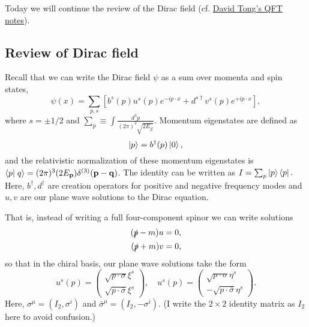 Today we will continue the review of the Dirac field (cf. \href{http://www.damtp.cam.ac.uk/user/tong/qft.html}{David Tong's QFT notes}).

\subsection*{Review of Dirac field} Recall that we can write the Dirac field $\psi$ as a sum over momenta and spin states,
\begin{equation}
    \psi(x)=\sum_{p,s}\left[ b^s(p) u^s(p) e^{-ip\cdot x}+d^{s\dagger}v^s(p) e^{+ip\cdot x}\right],
\end{equation}
where $s=\pm 1/2$ and $\sum_p\equiv \int \frac{d^3p}{(2\pi)^3 \sqrt{2E_{\vec p}}}$. Momentum eigenstates are defined as
\begin{equation*}
    \left| p \right>=b^\dagger(p)\left| 0 \right>,
\end{equation*}
and the relativistic normalization of these momentum eigenstates is $\braket{p}{q}=(2\pi)^3 (2E_{\vec p})\delta^{(3)}(\vec p - \vec q)$. The identity can be written as $I=\sum_p \left| p \right>\left< p \right|.$ Here, $b^\dagger,d^\dagger$ are creation operators for positive and negative frequency modes and $u,v$ are our plane wave solutions to the Dirac equation.

That is, instead of writing a full four-component spinor we can write solutions
\begin{align*}
    (\slashed{p}-m)u &=0,\\
    (\slashed{p}+m)v &=0,
\end{align*}
so that in the chiral basis, our plane wave solutions take the form
\begin{equation}
    u^s(p) = \begin{pmatrix}
        \sqrt{p\cdot \sigma} \xi^s\\
        \sqrt{p\cdot \bar \sigma} \xi^s
    \end{pmatrix},
    \quad
    u^s(p) = \begin{pmatrix}
        \sqrt{p\cdot \sigma} \eta^s\\
        -\sqrt{p\cdot \bar \sigma} \eta^s
    \end{pmatrix}.
\end{equation}
Here, $\sigma^\mu=(I_2,\sigma^i)$ and $\bar \sigma^\mu=(I_2,-\sigma^i)$. (I write the $2\times 2$ identity matrix as $I_2$ here to avoid confusion.)

